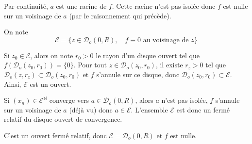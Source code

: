 Par continuité, $a$ est une racine de $f$. Cette racine n'est pas isolée donc $f$ est nulle sur un voisinage de $a$ (par le raisonnement qui précède).

On note \[
    \mathcal E=\{z\in \mathcal  D_o(0,R), \quad f\equiv 0\text{ au voisinage de }z\}
\]

Si $z_0\in \mathcal E$, alors on note $r_0>0$ le rayon d'un disque ouvert tel que $f(\mathcal D_o(z_0,r_0))=\{0\}$. Pour tout $z\in \mathcal D_o(z_0, r_0)$, il existe $r_z>0$ tel que $\mathcal D_o(z,r_z)\subset \mathcal D_o(z_0,r_0)$ et $f$ s'annule sur ce disque, donc $\mathcal D_o(z_0, r_0)\subset \mathcal E$. Ainsi, $\mathcal E$ est un ouvert.

Si $(x_n)\in \mathcal E^{\mathbb N}$ converge vers $a\in \mathcal D_o(0, R)$, alors $a$ n'est pas isolée, $f$ s'annule sur un voisinage de $a$ (déjà vu) donc $a\in \mathcal E$. L'ensemble $\mathcal E$ est donc un fermé relatif du disque ouvert de convergence.

C'est un ouvert fermé relatif, donc $\mathcal E=\mathcal D_o(0, R)$ et $f$ est nulle.

\endchapter
